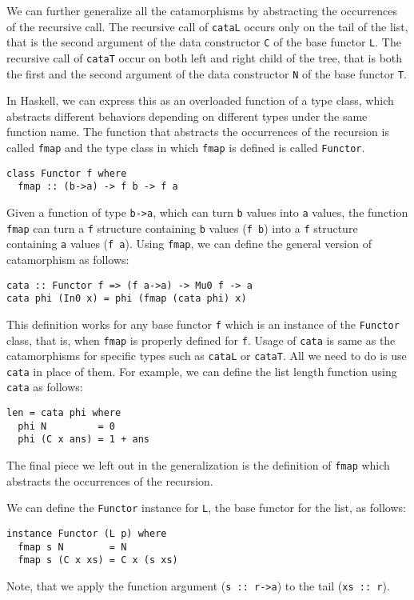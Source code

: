 \documentclass[letterpaper,12pt]{article}
\begin{document}
We can further generalize all the catamorphisms by abstracting
the occurrences of the recursive call.
The recursive call of \verb|cataL| occurs only on the tail of the list,
that is the second argument of the data constructor \verb|C| of the
base functor \verb|L|.
The recursive call of \verb|cataT| occur on both left and right child of
the tree, that is both the first and the second argument of the data
constructor \verb|N| of the base functor \verb|T|.

In Haskell, we can express this as an overloaded function of a type class,
which abstracts different behaviors depending on different types
under the same function name.  The function that abstracts the occurrences
of the recursion is called \verb|fmap| and
the type class in which \verb|fmap| is defined is called \verb|Functor|.
\begin{verbatim}
class Functor f where
  fmap :: (b->a) -> f b -> f a
\end{verbatim}
Given a function of type \verb|b->a|, which can turn \verb|b| values
into \verb|a| values, the function \verb|fmap| can turn
a \verb|f| structure containing \verb|b| values (\verb|f b|)
into a \verb|f| structure containing \verb|a| values (\verb|f a|).
Using \verb|fmap|, we can define the general version of catamorphism
as follows:
\begin{verbatim}
cata :: Functor f => (f a->a) -> Mu0 f -> a
cata phi (In0 x) = phi (fmap (cata phi) x)
\end{verbatim}
This definition works for any base functor \verb|f| which is an instance of
the \verb|Functor| class, that is, when \verb|fmap| is properly defined
for \verb|f|.
Usage of \verb|cata| is same as the catamorphisms for specific types such as
\verb|cataL| or \verb|cataT|.  All we need to do is use \verb|cata| in
place of them.  For example, we can define the list length function
using \verb|cata| as follows:
\begin{verbatim}
len = cata phi where
  phi N         = 0
  phi (C x ans) = 1 + ans
\end{verbatim}

The final piece we left out in the generalization is the definition of
\verb|fmap| which abstracts the occurrences of the recursion.

We can define the \verb|Functor| instance for \verb|L|,
the base functor for the list, as follows: 
\begin{verbatim}
instance Functor (L p) where
  fmap s N        = N
  fmap s (C x xs) = C x (s xs)
\end{verbatim}
Note, that we apply the function argument (\verb|s :: r->a|)
to the tail (\verb|xs :: r|).
\end{document}
